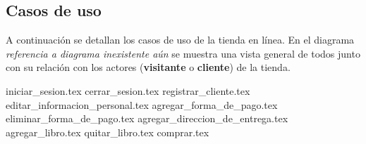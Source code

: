 %
%

\subsection{Casos de uso}

A continuación se detallan los casos de uso de la tienda en línea. En el
diagrama \textit{referencia a diagrama inexistente aún} se muestra una vista
general de todos junto con su relación con los actores (\textbf{visitante} o
\textbf{cliente}) de la tienda.


{iniciar_sesion.tex}
{cerrar_sesion.tex}
{registrar_cliente.tex}
{editar_informacion_personal.tex}
{agregar_forma_de_pago.tex}
{eliminar_forma_de_pago.tex}
{agregar_direccion_de_entrega.tex}
{agregar_libro.tex}
{quitar_libro.tex}
{comprar.tex}
